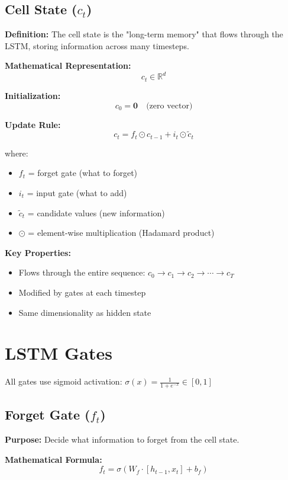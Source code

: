 \documentclass[12pt]{article}
\begin{document}
\subsection{Cell State ($c_t$)}

\textbf{Definition:} The cell state is the "long-term memory" that flows through the LSTM, storing information across many timesteps.

\textbf{Mathematical Representation:}
\[
c_t \in \mathbb{R}^d
\]

\textbf{Initialization:}
\[
c_0 = \mathbf{0} \quad \text{(zero vector)}
\]

\textbf{Update Rule:}
\[
c_t = f_t \odot c_{t-1} + i_t \odot \tilde{c}_t
\]

where:
\begin{itemize}
    \item $f_t$ = forget gate (what to forget)
    \item $i_t$ = input gate (what to add)
    \item $\tilde{c}_t$ = candidate values (new information)
    \item $\odot$ = element-wise multiplication (Hadamard product)
\end{itemize}

\textbf{Key Properties:}
\begin{itemize}
    \item Flows through the entire sequence: $c_0 \rightarrow c_1 \rightarrow c_2 \rightarrow \cdots \rightarrow c_T$
    \item Modified by gates at each timestep
    \item Same dimensionality as hidden state
\end{itemize}

\section{LSTM Gates}

All gates use sigmoid activation: $\sigma(x) = \frac{1}{1 + e^{-x}} \in [0, 1]$

\subsection{Forget Gate ($f_t$)}

\textbf{Purpose:} Decide what information to forget from the cell state.

\textbf{Mathematical Formula:}
\[
f_t = \sigma(W_f \cdot [h_{t-1}, x_t] + b_f)
\]
\end{document}
